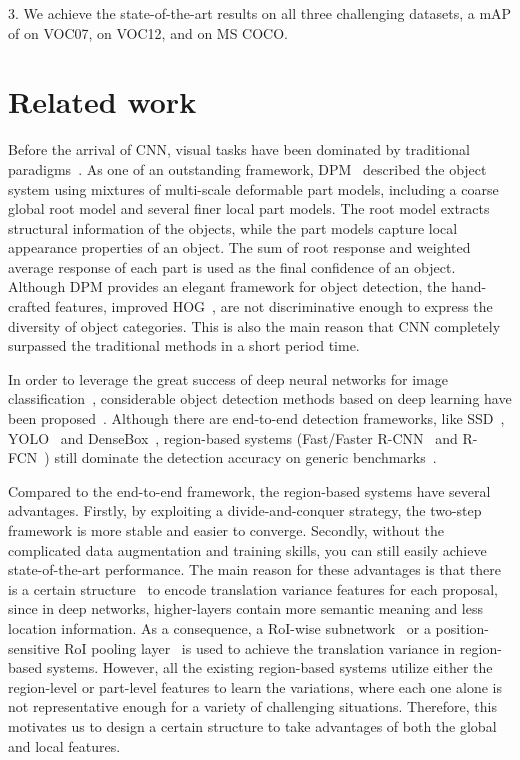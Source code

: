 \documentclass[10pt,twocolumn,letterpaper]{article}
\begin{document}
3. We achieve the state-of-the-art results on all three challenging datasets, \ie a mAP of  on VOC07,  on VOC12, and  on MS COCO.

\section{Related work}
Before the arrival of CNN, visual tasks have been dominated by traditional paradigms~\cite{dollar2014fast, felzenszwalb2010object, viola2004robust, wang2014bilayer, wang2008multimodal}. As one of an outstanding framework, DPM~\cite{felzenszwalb2010object} described the object system using mixtures of multi-scale deformable part models, including a coarse global root model and several finer local part models. The root model extracts structural information of the objects, while the part models capture local appearance properties of an object. The sum of root response and weighted average response of each part is used as the final confidence of an object. Although DPM provides an elegant framework for object detection, the hand-crafted features, \ie improved HOG~\cite{dalal2005histograms}, are not discriminative enough to express the diversity of object categories. This is also the main reason that CNN completely surpassed the traditional methods in a short period time.

In order to leverage the great success of deep neural networks for image classification~\cite{he2016deep, krizhevsky2012imagenet}, considerable object detection methods based on deep learning have been proposed~\cite{girshick2014rich, he2014spatial, liu2016ssd, redmon2016you, zhu2016scale}. Although there are end-to-end detection frameworks, like SSD~\cite{liu2016ssd}, YOLO~\cite{redmon2016you} and DenseBox~\cite{huang2015densebox}, region-based systems (\ie Fast/Faster R-CNN~\cite{girshick2015fast, ren2015faster} and R-FCN~\cite{li2016r}) still dominate the detection accuracy on generic benchmarks~\cite{everingham2010pascal, lin2014microsoft}.

Compared to the end-to-end framework, the region-based systems have several advantages. Firstly, by exploiting a divide-and-conquer strategy, the two-step framework is more stable and easier to converge. Secondly, without the complicated data augmentation and training skills, you can still easily achieve state-of-the-art performance. The main reason for these advantages is that there is a certain structure~\cite{girshick2015fast, li2016r, ren2015faster} to encode translation variance features for each proposal, since in deep networks, higher-layers contain more semantic meaning and less location information. As a consequence, a RoI-wise subnetwork~\cite{girshick2015fast, ren2015faster} or a position-sensitive RoI pooling layer~\cite{li2016r} is used to achieve the translation variance in region-based systems. However, all the existing region-based systems utilize either the region-level or part-level features to learn the variations, where each one alone is not representative enough for a variety of challenging situations. Therefore, this motivates us to design a certain structure to take advantages of both the global and local features.
\end{document}

